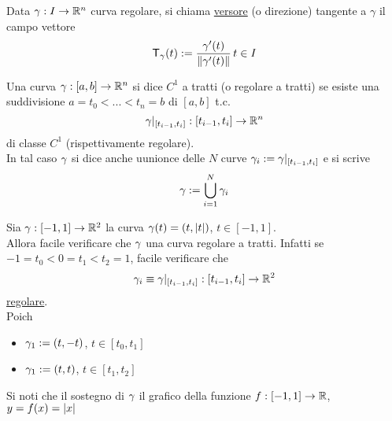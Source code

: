 \begin{definition}
  Data $\gamma : I \to \mathbb{R}^n$ curva regolare, si chiama \underline{versore} (o direzione) tangente a $\gamma$
  il campo vettore $$\mathsf{T}_{\gamma} (t) := \frac{\gamma'(t)}{\left\lVert\gamma'(t)\right\rVert} \, t \in I$$
\end{definition}
\begin{definition}
  Una curva $\gamma : [a,b]\to\mathbb{R}^n$ si dice $C^1$ a tratti (o regolare a tratti) se esiste una 
  suddivisione $a = t_0 < ... < t_n = b$ di $[a,b]$ t.c.
  $$\gamma|_{[t_{i-1},t_i]}:[t_{i-1},t_i] \to \mathbb{R}^n$$
  \ace di classe $C^1$ (rispettivamente regolare).\\
  In tal caso $\gamma$ si dice anche uunionce delle $N$ curve $\gamma_i := \gamma|_{[t_{i-1},t_i]}$
  e si scrive $$\gamma:= \bigcup_{i=1}^{N} \gamma_i$$
\end{definition}
\begin{example}
  Sia $\gamma:[-1,1]\to \mathbb{R}^2$ la curva $\gamma(t) = (t,\left\lvert t \right\rvert)$, $t \in [-1,1]$. \\
  Allora \ace facile verificare che $\gamma$ una curva regolare a tratti. Infatti
  se $-1 = t_0 < 0 = t_1 < t_2 = 1$, \ace facile verificare che 
  $$\gamma_i \equiv \gamma|_{[t_{i-1},t_i]} : [t_{i-1},t_i] \to \mathbb{R}^2$$
  \ace \underline{regolare}. \\
  Poich\ace 
  \begin{itemize}
    \item $\gamma_1 := (t,-t)$, $t\in[t_0,t_1]$
    \item $\gamma_1 := (t,t)$, $t\in[t_1,t_2]$
  \end{itemize}
  Si noti che il sostegno di $\gamma$ \ace il grafico della funzione $f:[-1,1]\to\mathbb{R}$, $y = f(x) = \left\lvert x \right\rvert$
\end{example}
